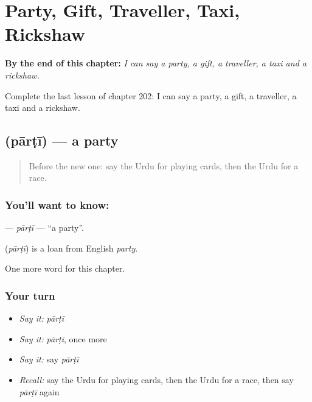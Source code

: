 
\chapter{Party, Gift, Traveller, Taxi, Rickshaw}
\label{ch:ur-party-gift-traveller-taxi-rickshaw}

\begin{chapteropening}
\textbf{By the end of this chapter:} \emph{I can say a party, a gift, a traveller, a taxi and a rickshaw.}

Complete the last lesson of chapter 202: I can say a party, a gift, a traveller, a taxi and a rickshaw.
\end{chapteropening}

\section[\texorpdfstring{\ur{پارٹی} (pārṭī)}{پارٹی (pārṭī)}]{ (pārṭī) — a party}

\label{lesson:UR-C202-parti}



\begin{quote}
Before the new one: say the Urdu for playing cards, then the Urdu for a race.
\end{quote}

\subsection*{You'll want to know: }
\textbf{} — \emph{pārṭī} — \textquotedblleft{}a party\textquotedblright{}.

\begin{cousinweb}
\textbf{} (\emph{pārṭī}) is a loan from English \emph{party}.
\end{cousinweb}

\begin{grammarlens}[title={What you've built}]
One more word for this chapter.
\end{grammarlens}

\subsection*{Your turn}
\begin{itemize}
\raggedright
  \item \emph{Say it:} \emph{pārṭī}
  \item \emph{Say it:} \emph{pārṭī}, once more
  \item \emph{Say it:} say \emph{pārṭī}
  \item \emph{Recall:} say the Urdu for playing cards, then the Urdu for a race, then say \emph{pārṭī} again
\end{itemize}

